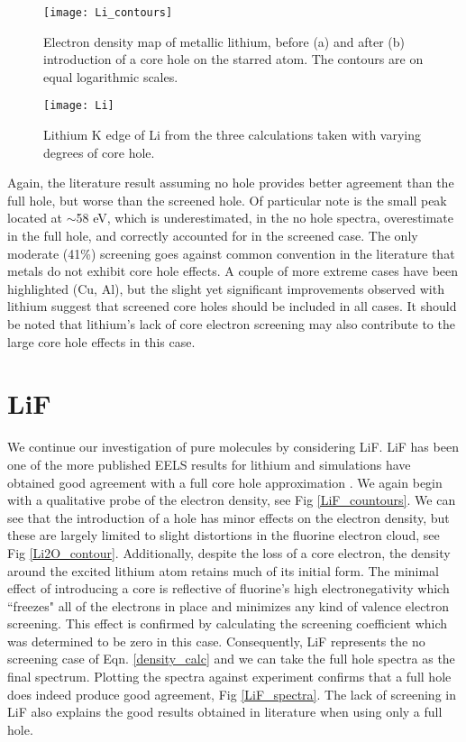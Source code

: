 \begin{figure}
	\centering
	\texttt{[image: Li\_contours]}
	\caption{Electron density map of metallic lithium, before (a) and after (b) introduction of a core hole on the starred atom.  The contours are on equal logarithmic scales.}
	\label{Li_countours}
\end{figure}




\begin{figure}
	\centering
	\texttt{[image: Li]}
	\caption{Lithium K edge of Li from the three calculations taken with varying degrees of core hole. }
	\label{Li_spectra}
\end{figure}


Again, the literature result assuming no hole provides better agreement than the full hole, but worse than the screened hole.  Of particular note is the small peak located at $ \sim$58 eV, which is underestimated, in the no hole spectra, overestimate in the full hole, and correctly accounted for in the screened case.  The only moderate (41\%) screening goes against common convention in the literature that metals do not exhibit core hole effects.  A couple of more extreme cases have been highlighted  (Cu, Al), but the slight yet significant improvements observed with lithium suggest that screened core holes should be included in all cases.  It should be noted that lithium's lack of core electron screening may also contribute to the large core hole effects in this case. 

\section{LiF}
We continue our investigation of pure molecules by considering LiF.  LiF has been one of the more published EELS results for lithium and simulations have obtained good agreement with a full core hole approximation \cite{mauchamp_ab_2006}.  We again begin with a qualitative probe of the electron density, see Fig \ref{LiF_countours}.  We can see that the introduction of a hole has minor effects on the electron density, but these are largely limited to slight distortions in the fluorine electron cloud, see Fig \ref{Li2O_contour}. Additionally, despite the loss of a core electron, the density around the excited lithium atom retains much of its initial form. The minimal effect of introducing a core is reflective of fluorine's high electronegativity which ``freezes" all of the electrons in place and minimizes any kind of valence electron screening.  This effect is confirmed by calculating the screening coefficient which was determined to be zero in this case. Consequently, LiF represents the no screening case of Eqn. \ref{density_calc} and we can take the full hole spectra as the final spectrum.  Plotting the spectra against experiment confirms that a full hole does indeed produce good agreement, Fig \ref{LiF_spectra}.  The lack of screening in LiF also explains the good results obtained in literature when using only a full hole.  


